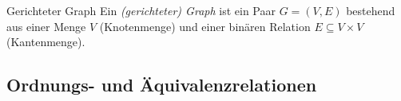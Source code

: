 \begin{definition}{Gerichteter Graph}
    Ein \textit{(gerichteter) Graph} ist ein Paar $G=(V,E)$ bestehend aus einer Menge $V$ (Knotenmenge)
    und einer binären Relation $E\subseteq V\times V$ (Kantenmenge).
\end{definition}






\subsection{Ordnungs- und Äquivalenzrelationen}

